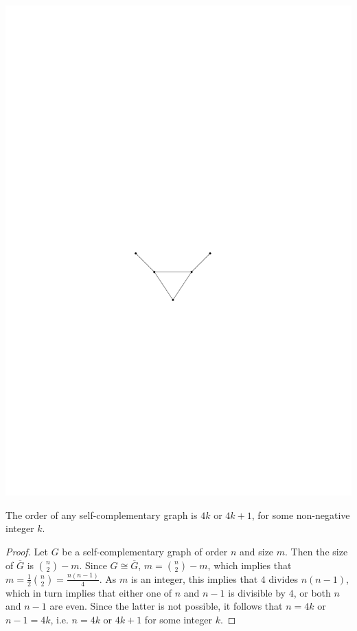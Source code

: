 \begin{center}
\includegraphics{Images/BullGraph.pdf}
\end{center}

\begin{Theorem}\label{thm:SCOrder}
The order of any self-complementary graph is $4k$ or $4k + 1$, for some non-negative integer $k$.
\end{Theorem}

\begin{proof}
Let $G$ be a self-complementary graph of order $n$ and size $m$. Then the size of $\overline G$ is $\binom n 2 - m$. Since $G \cong \overline G$, $m = \binom n 2 - m$, which implies that $m = \frac 1 2 \binom n 2 = \frac {n(n - 1)}{4}$. As $m$ is an integer, this implies that $4$ divides $n(n - 1)$, which in turn implies that either one of $n$ and $n - 1$ is divisible by $4$, or both $n$ and $n - 1$ are even. Since the latter is not possible, it follows that $n = 4k$ or $n - 1 = 4k$, i.e. $n = 4k$ or $4k + 1$ for some integer $k$.
\end{proof}


